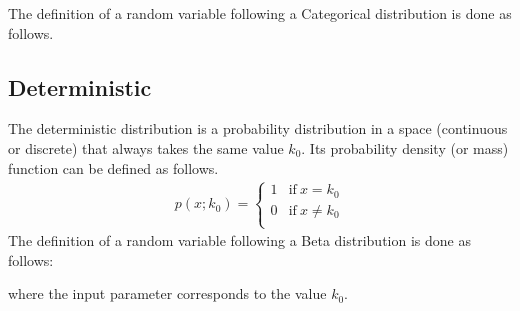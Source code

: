 \documentclass[letterpaper,10pt,english]{sphinxmanual}
\begin{document}
The definition of a random variable following a Categorical distribution is done as follows.

\begin{sphinxVerbatim}[commandchars=\\\{\}]
  \PYG{p}{[}\PYG{p}{]}


  \PYG{p}{[}\PYG{p}{]}
\end{sphinxVerbatim}


\subsection{Deterministic}
\label{\detokenize{notes/guidemodels:deterministic}}
The deterministic distribution is a probability distribution in a space (continuous or discrete) that always takes
the same value \(k_0\). Its probability density (or mass) function can be defined as follows.
\begin{equation*}
\begin{split}p(x;k_0) =\left\{\begin{array}{cc} 1 & \mathrm{if\ } x=k_0 \\
 0 & \mathrm{if\ } x \neq k_0 \\ \end{array} \right.\end{split}
\end{equation*}
The definition of a random variable following a Beta distribution is done as follows:

\begin{sphinxVerbatim}[commandchars=\\\{\}]
  
\end{sphinxVerbatim}

where the input parameter  corresponds to the value \(k_0\).
\end{document}
